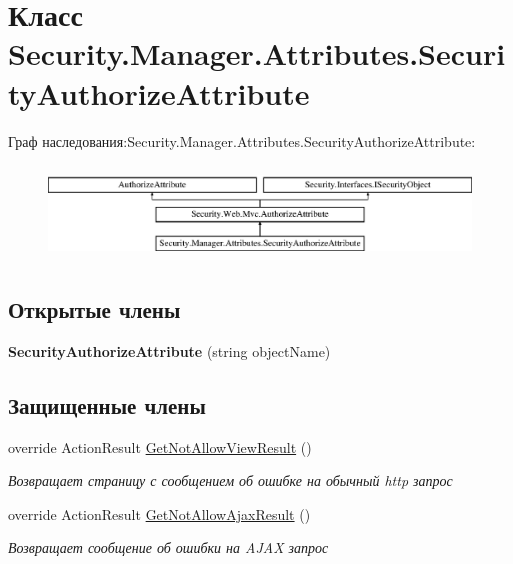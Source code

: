 \hypertarget{class_security_1_1_manager_1_1_attributes_1_1_security_authorize_attribute}{}\section{Класс Security.\+Manager.\+Attributes.\+Security\+Authorize\+Attribute}
\label{class_security_1_1_manager_1_1_attributes_1_1_security_authorize_attribute}
Граф наследования\+:Security.\+Manager.\+Attributes.\+Security\+Authorize\+Attribute\+:\begin{figure}[H]
\begin{center}
\leavevmode
\includegraphics[height=2.537765cm]{d7/dfd/class_security_1_1_manager_1_1_attributes_1_1_security_authorize_attribute}
\end{center}
\end{figure}
\subsection*{Открытые члены}
\begin{DoxyCompactItemize}
\item 
\mbox{\label{class_security_1_1_manager_1_1_attributes_1_1_security_authorize_attribute_a801f17dbe6f113de7ae1edddf9e2aed3}} 
{\bfseries Security\+Authorize\+Attribute} (string object\+Name)
\end{DoxyCompactItemize}
\subsection*{Защищенные члены}
\begin{DoxyCompactItemize}
\item 
override Action\+Result \hyperlink{class_security_1_1_manager_1_1_attributes_1_1_security_authorize_attribute_a49eb91d14a4298c341d6afd66a5848ff}{Get\+Not\+Allow\+View\+Result} ()
\begin{DoxyCompactList}\small\item\em Возвращает страницу с сообщением об ошибке на обычный http запрос \end{DoxyCompactList}\item 
override Action\+Result \hyperlink{class_security_1_1_manager_1_1_attributes_1_1_security_authorize_attribute_a714bab2b66d43e8266323741eb6c9853}{Get\+Not\+Allow\+Ajax\+Result} ()
\begin{DoxyCompactList}\small\item\em Возвращает сообщение об ошибки на A\+J\+AX запрос \end{DoxyCompactList}\end{DoxyCompactItemize}
